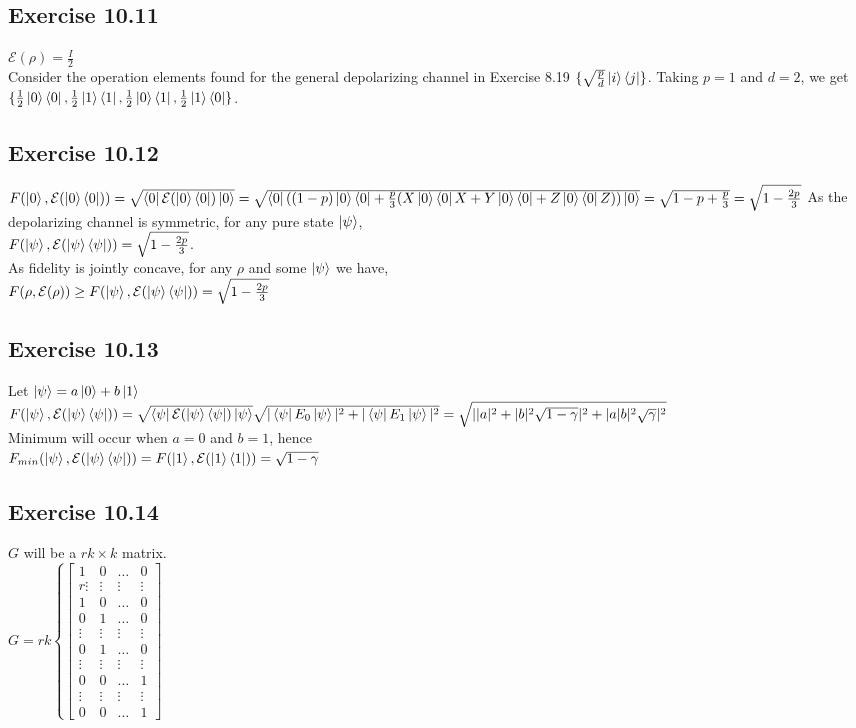 \documentclass[a4paper,12pt]{article}
\begin{document}
\subsection*{Exercise 10.11}
$\mathcal{E}(\rho)=\frac{I}{2}$\\
Consider the operation elements found for the general depolarizing channel in Exercise
8.19 $\{\sqrt{\frac{p}{d}}\ket{i}\bra{j}\}$. Taking $p=1$ and $d=2$, we get 
$\{\frac{1}{2}\ket{0}\bra{0},\frac{1}{2}\ket{1}\bra{1},\frac{1}{2}\ket{0}\bra{1},\frac{1}{2}\ket{1}\bra{0}\}$.
\subsection*{Exercise 10.12}
$F(\ket{0},\mathcal{E}(\ket{0}\bra{0}))=\sqrt{\bra{0}\mathcal{E}(\ket{0}\bra{0})\ket{0}}\\
=\sqrt{\bra{0}((1-p)\ket{0}\bra{0}+\frac{p}{3}(X\ket{0}\bra{0}X+Y\ket{0}\bra{0}+Z\ket{0}\bra{0}Z))\ket{0}}=
\sqrt{1-p+\frac{p}{3}}=\sqrt{1-\frac{2p}{3}}$
As the depolarizing channel is symmetric, for any pure state $\ket{\psi}$,\\ 
$F(\ket{\psi},\mathcal{E}(\ket{\psi}\bra{\psi}))=\sqrt{1-\frac{2p}{3}}$. \\As fidelity is
jointly concave, for any $\rho$ and some $\ket{\psi}$ we have,\\
$F(\rho, \mathcal{E}(\rho))\geq F(\ket{\psi},\mathcal{E}(\ket{\psi}\bra{\psi}))=\sqrt{1-\frac{2p}{3}}$
\subsection*{Exercise 10.13}
Let $\ket{\psi}=a\ket{0}+b\ket{1}$\\
$F(\ket{\psi},\mathcal{E}(\ket{\psi}\bra{\psi}))=\sqrt{\bra{\psi}\mathcal{E}(\ket{\psi}\bra{\psi})\ket{\psi}}
\\
\sqrt{|\bra{\psi}E_0\ket{\psi}|^2+|\bra{\psi}E_1\ket{\psi}|^2}=
\sqrt{||a|^2+|b|^2\sqrt{1-\gamma}|^2+|a|b|^2\sqrt{\gamma}|^2}$\\
Minimum will occur when $a=0$ and $b=1$, hence\\
$F_{min}(\ket{\psi},\mathcal{E}(\ket{\psi}\bra{\psi}))=F(\ket{1},\mathcal{E}(\ket{1}\bra{1}))=\sqrt{1-\gamma}$
\subsection*{Exercise 10.14}
$G$ will be a $rk\times k$ matrix.\\
$G=
rk\left\{
\begin{bmatrix}
    1 & 0 & \ldots & 0\\
    \scriptstyle{r}\vdots & \vdots & \vdots & \vdots\\
    1 & 0 & \ldots & 0\\
    0 & 1 & \ldots & 0\\
    \vdots & \vdots & \vdots & \vdots\\
    0 & 1 & \ldots & 0\\
    \vdots & \vdots & \vdots & \vdots\\
    0 & 0 & \ldots & 1\\
    \vdots & \vdots & \vdots & \vdots\\
    0 & 0 & \ldots & 1
    
\end{bmatrix}\right.$
\newpage
\end{document}
